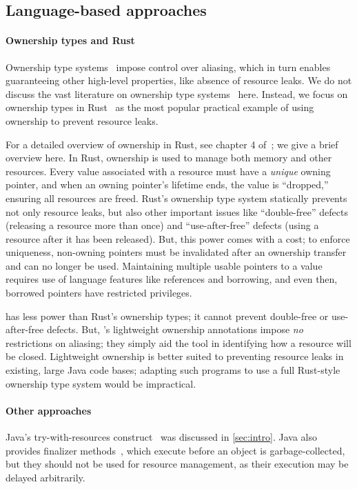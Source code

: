 \subsection{Language-based approaches}\label{sec:rw-language}

\paragraph{Ownership types and Rust} Ownership type
systems~\cite{clarke2013ownership} impose control over aliasing, which
in turn enables guaranteeing other high-level properties, like absence of
resource leaks.  We do not discuss the vast literature on ownership type
systems~\cite{clarke2013ownership} here.
Instead, we
focus on ownership types in Rust~\cite{klabnik2018rust} as the most popular
practical example of using ownership to prevent resource leaks.

For a detailed overview of ownership in Rust, see chapter 4
of~\cite{klabnik2018rust}; we give a brief overview here.  In Rust, ownership is
used to manage both memory and other resources.  Every value associated with a
resource must have a \emph{unique} owning pointer, and when an owning pointer's
lifetime ends, the value is ``dropped,'' ensuring all resources are freed.
Rust's ownership type system statically prevents
not only resource leaks, but also other important issues like ``double-free'' defects
(releasing a resource more than once) and ``use-after-free'' defects (using a
resource after it has been released). But, this power comes with a cost; to
enforce uniqueness, non-owning pointers must be invalidated after an ownership transfer
and can no longer be used.  Maintaining multiple
usable pointers to a value requires use of language features like references and
borrowing, and even then, borrowed pointers have restricted privileges.

\Tool has less power than Rust's ownership types; it cannot prevent double-free
or use-after-free defects.  But,
\tool's lightweight ownership annotations impose \emph{no} restrictions on
aliasing; they simply aid the tool in identifying how a resource will
be closed.  Lightweight ownership is better suited to preventing
resource leaks in existing, large Java code bases; adapting such programs to use
a full Rust-style ownership type system would be impractical.

\paragraph{Other approaches} Java's try-with-resources
construct~\cite{try-with-resources} was discussed in \cref{sec:intro}.  Java
also provides finalizer methods~\cite[Chapter 12]{gosling2014jls}, which execute before an object is
garbage-collected, but they should not be used for resource management, as their
execution may be delayed arbitrarily.

